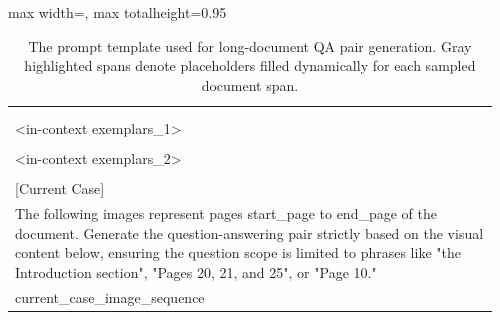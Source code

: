 \documentclass{llmxive}
\providecommand{\promptplaceholder}[1]{\colorbox{gray!12}{\ttfamily #1}}
\begin{document}
{{{\begin{table}[!htbp]
\begin{adjustbox}{max width=\textwidth, max totalheight=0.95\textheight}
\begin{tabular}{p{0.96\linewidth}}
\begin{minipage}{0.96\linewidth}
 \textless \textgreater\\[2pt]
 \quad \\
 \promptplaceholder{<in-context exemplars\_1>} \\
 \quad \\
 \promptplaceholder{<in-context exemplars\_2>} \\
 \quad \\
 {[}Current Case{]}\\
 The following images represent pages \promptplaceholder{start\_page} to \promptplaceholder{end\_page} of the document. Generate the question-answering pair strictly based on the visual content below, ensuring the question scope is limited to phrases like "the Introduction section", "Pages 20, 21, and 25", or "Page 10." \\
 \promptplaceholder{current\_case\_image\_sequence}
 \end{minipage} \\
 \bottomrule
 \end{tabular}
 \end{adjustbox}
\caption{The prompt template used for long-document QA pair generation. Gray highlighted spans denote placeholders filled dynamically for each sampled document span.}
\label{tab:qa_generation_prompt}
\end{table}


}}}
\end{document}
